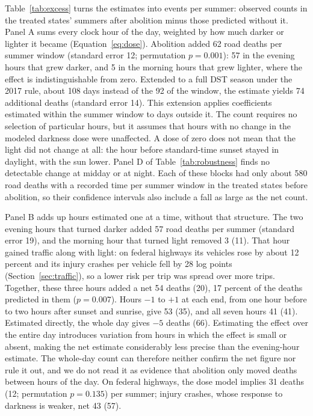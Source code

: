 Table~\ref{tab:excess} turns the estimates into events per summer: observed counts in the treated states' summers after abolition minus those predicted without it. Panel A sums every clock hour of the day, weighted by how much darker or lighter it became (Equation~\ref{eq:dose}). Abolition added 62 road deaths per summer window (standard error 12; permutation $p=0.001$): 57 in the evening hours that grew darker, and 5 in the morning hours that grew lighter, where the effect is indistinguishable from zero. Extended to a full DST season under the 2017 rule, about 108 days instead of the 92 of the window, the estimate yields 74 additional deaths (standard error 14). This extension applies coefficients estimated within the summer window to days outside it. The count requires no selection of particular hours, but it assumes that hours with no change in the modeled darkness dose were unaffected. A dose of zero does not mean that the light did not change at all: the hour before standard-time sunset stayed in daylight, with the sun lower. Panel D of Table~\ref{tab:robustness} finds no detectable change at midday or at night. Each of these blocks had only about 580 road deaths with a recorded time per summer window in the treated states before abolition, so their confidence intervals also include a fall as large as the net count. %

Panel B adds up hours estimated one at a time, without that structure. The two evening hours that turned darker added 57 road deaths per summer (standard error 19), and the morning hour that turned light removed 3 (11). That hour gained traffic along with light: on federal highways its vehicles rose by about 12 percent and its injury crashes per vehicle fell by 28 log points (Section~\ref{sec:traffic}), so a lower risk per trip was spread over more trips. Together, these three hours added a net 54 deaths (20), 17 percent of the deaths predicted in them ($p=0.007$). %
Hours $-1$ to $+1$ at each end, from one hour before to two hours after sunset and sunrise, give 53 (35), and all seven hours 41 (41). Estimated directly, the whole day gives $-5$ deaths (66). Estimating the effect over the entire day introduces variation from hours in which the effect is small or absent, making the net estimate considerably less precise than the evening-hour estimate. The whole-day count can therefore neither confirm the net figure nor rule it out, and we do not read it as evidence that abolition only moved deaths between hours of the day. On federal highways, the dose model implies 31 deaths (12; permutation $p=0.135$) per summer; injury crashes, whose response to darkness is weaker, net 43 (57).

